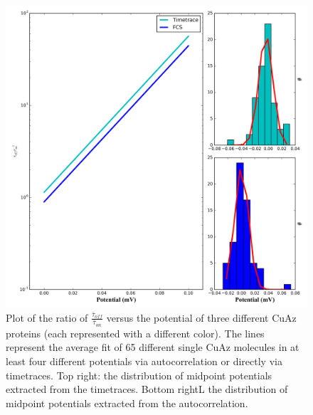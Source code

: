 \documentclass[twoside,single]{lion-msc}
\begin{document}
\begin{figure}[ht!]
\centering
\includegraphics[width=\textwidth]{t_ratio_plot}
\caption{Plot of the ratio of $\frac{\bar{\tau}_{off}}{\bar{\tau}_{on}}$ versus the potential of three different CuAz proteins (each represented with a different color). The lines represent the average fit of 65 different single CuAz molecules in at least four different potentials via autocorrelation or directly via timetraces. Top right: the distribution of midpoint potentials extracted from the timetraces. Bottom rightL the distribution of midpoint potentials extracted from the autocorrelation.}
\label{t_ratio_plot}
\end{figure}



\end{document}
